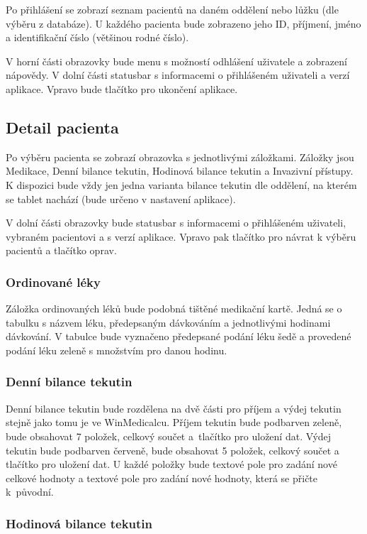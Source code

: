Po přihlášení se zobrazí seznam pacientů na daném oddělení nebo lůžku (dle výběru z databáze). U každého pacienta bude zobrazeno jeho ID, příjmení, jméno a identifikační číslo (většinou rodné číslo).

V horní části obrazovky bude menu s možností odhlášení uživatele a zobrazení nápovědy. V dolní části statusbar s informacemi o přihlášeném uživateli a verzí aplikace. Vpravo bude tlačítko pro ukončení aplikace.

\subsection{Detail pacienta}

Po výběru pacienta se zobrazí obrazovka s jednotlivými záložkami. Záložky jsou Medikace, Denní bilance tekutin, Hodinová bilance tekutin a Invazivní přístupy. K dispozici bude vždy jen jedna varianta bilance tekutin dle oddělení, na kterém se tablet nachází (bude určeno v nastavení aplikace).

V dolní části obrazovky bude statusbar s informacemi o přihlášeném uživateli, vybraném pacientovi a s verzí aplikace. Vpravo pak tlačítko pro návrat k výběru pacientů a tlačítko oprav.

\subsubsection{Ordinované léky}

Záložka ordinovaných léků bude podobná tištěné medikační kartě. Jedná se o tabulku s názvem léku, předepsaným dávkováním a jednotlivými hodinami dávkování. V tabulce bude vyznačeno předepsané podání léku šedě a provedené podání léku zeleně s množstvím pro danou hodinu.

\subsubsection{Denní bilance tekutin}

Denní bilance tekutin bude rozdělena na dvě části pro příjem a výdej tekutin stejně jako tomu je ve WinMedicalcu. Příjem tekutin bude podbarven zeleně, bude obsahovat 7 položek, celkový součet a~tlačítko pro uložení dat. Výdej tekutin bude podbarven červeně, bude obsahovat 5 položek, celkový součet a tlačítko pro uložení dat. U každé položky bude textové pole pro zadání nové celkové hodnoty a textové pole pro zadání nové hodnoty, která se přičte k~původní.

\subsubsection{Hodinová bilance tekutin}

